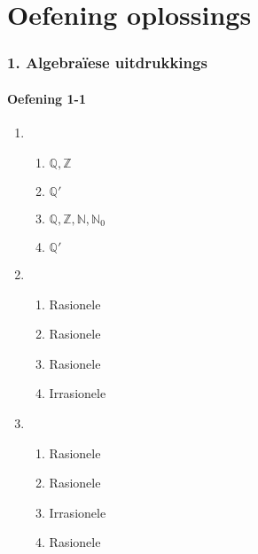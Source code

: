 \chapter{Oefening oplossings}
\small{
\subsection*{1. Algebraïese uitdrukkings}
\begin{multicols}{3}
\subsubsection*{Oefening 1-1} %

\begin{enumerate}[noitemsep, label=\textbf{\arabic*}. ] 
\item %
  \begin{enumerate}[noitemsep, label=\textbf{(\alph*)} ] 
    \item $\mathbb{Q}, \mathbb{Z}$ %
    \item $\mathbb{Q'}$%
    \item $\mathbb{Q}, \mathbb{Z}, \mathbb{N}, \mathbb{N}_0$%
    \item $\mathbb{Q'}$ %
  \end{enumerate}  
\item %
  \begin{enumerate}[noitemsep, label=\textbf{(\alph*)} ] 
    \item Rasionele
    \item Rasionele
    \item Rasionele
    \item Irrasionele
    \end{enumerate}
\item %
    \begin{enumerate}[noitemsep, label=\textbf{(\alph*)} ] 
    \item Rasionele
    \item Rasionele
    \item Irrasionele
    \item Rasionele
    \end{enumerate}


\end{enumerate}
\end{multicols}}
